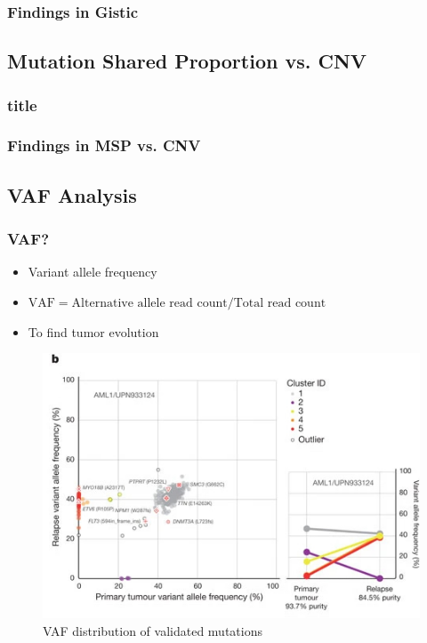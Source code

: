 \documentclass{beamer}
\begin{document}
    \begin{frame}
        \frametitle{Findings in Gistic}
    \end{frame}

    \subsection{Mutation Shared Proportion vs. CNV}
    \begin{frame}
        \frametitle{title}
    \end{frame}

    \begin{frame}
        \frametitle{Findings in MSP vs. CNV}
    \end{frame}

    \subsection{VAF Analysis}
    \begin{frame}
        \frametitle{VAF?}

        \begin{itemize}
            \item Variant allele frequency
            \item $\textrm{VAF} = \textrm{Alternative allele read count} / \textrm{Total read count}$
            \item To find tumor evolution
        \end{itemize}

        \begin{figure}
            \includegraphics[width=0.4 \linewidth]{figures/VAF/VAF.jpg}
            \caption{VAF distribution of validated mutations \protect\cite{VAF1}}
        \end{figure}
    \end{frame}
\end{document}
